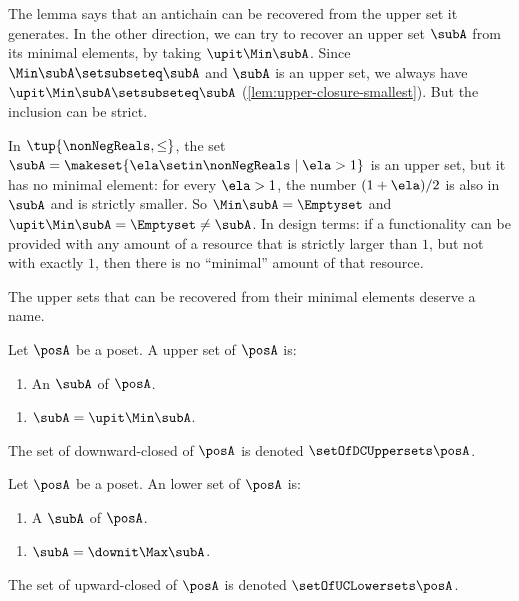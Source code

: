 The lemma says that an antichain can be recovered from the upper set it generates.
In the other direction, we can try to recover an upper set $\subA$ from its minimal elements, by taking $\upit \Min \subA$.
Since $\Min \subA \setsubseteq \subA$ and $\subA$ is an upper set, we always have $\upit \Min \subA \setsubseteq \subA$ (\cref{lem:upper-closure-smallest}).
But the inclusion can be strict.

\begin{example}
    \label{exa:upper-set-no-min}
    In $\tup{\nonNegReals, \leq}$, the set $\subA = \makeset{\ela \setin \nonNegReals \mid \ela > 1}$ is an upper set, but it has no minimal element: for every $\ela > 1$, the number $(1 + \ela)/2$ is also in $\subA$ and is strictly smaller.
    So $\Min \subA = \Emptyset$ and $\upit \Min \subA = \Emptyset \neq \subA$.
    In design terms: if a functionality can be provided with any amount of a resource that is strictly larger than $1$, but not with exactly $1$, then there is no ``minimal'' amount of that resource.
\end{example}

The upper sets that can be recovered from their minimal elements deserve a name.

\begin{definition}
    \label{def:downward-closed-upperset}
    Let $\posA$ be a poset. A  upper set of $\posA$ is:

    \constit
    \begin{enumerate}
        \item An  $\subA$ of $\posA$.
    \end{enumerate}

    \condit
    \begin{enumerate}
        \item $\subA = \upit \Min \subA$.
    \end{enumerate}
    The set of downward-closed  of $\posA$ is denoted $\setOfDCUppersets \posA$.
\end{definition}

\begin{definition}
    \label{def:upward-closed-lowerset}
    Let $\posA$ be a poset. An  lower set of $\posA$ is:

    \constit
    \begin{enumerate}
        \item A  $\subA$ of $\posA$.
    \end{enumerate}

    \condit
    \begin{enumerate}
        \item $\subA = \downit \Max \subA$.
    \end{enumerate}
    The set of upward-closed  of $\posA$ is denoted $\setOfUCLowersets \posA$.
\end{definition}

